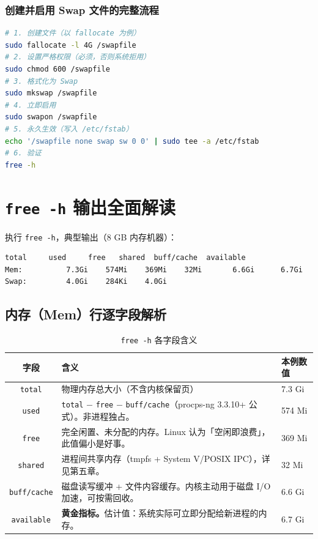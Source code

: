 \subsection*{创建并启用 Swap 文件的完整流程}

\begin{lstlisting}[language=bash]
# 1. 创建文件（以 fallocate 为例）
sudo fallocate -l 4G /swapfile
# 2. 设置严格权限（必须，否则系统拒用）
sudo chmod 600 /swapfile
# 3. 格式化为 Swap
sudo mkswap /swapfile
# 4. 立即启用
sudo swapon /swapfile
# 5. 永久生效（写入 /etc/fstab）
echo '/swapfile none swap sw 0 0' | sudo tee -a /etc/fstab
# 6. 验证
free -h
\end{lstlisting}


\chapter{\texttt{free -h} 输出全面解读}

执行 \texttt{free -h}，典型输出（8 GB 内存机器）：

\begin{lstlisting}[language=bash]
              total     used     free   shared  buff/cache  available
Mem:          7.3Gi    574Mi    369Mi    32Mi       6.6Gi      6.7Gi
Swap:         4.0Gi    284Ki    4.0Gi
\end{lstlisting}

\section{内存（Mem）行逐字段解析}

\begin{table}[htbp]
\centering
\caption{\texttt{free -h} 各字段含义}
\begin{tabular}{@{}c p{6.5cm} p{5cm}@{}}
\toprule
\textbf{字段} & \textbf{含义} & \textbf{本例数值} \\
\midrule
\texttt{total}   & 物理内存总大小（不含内核保留页） & 7.3 Gi \\
\addlinespace
\texttt{used}    & \texttt{total} $-$ \texttt{free} $-$ \texttt{buff/cache}（procps-ng 3.3.10+ 公式）。非进程独占。 & 574 Mi \\
\addlinespace
\texttt{free}    & 完全闲置、未分配的内存。Linux 认为「空闲即浪费」，此值偏小是好事。 & 369 Mi \\
\addlinespace
\texttt{shared}  & 进程间共享内存（tmpfs + System V/POSIX IPC），详见第五章。 & 32 Mi \\
\addlinespace
\texttt{buff/cache} & 磁盘读写缓冲 + 文件内容缓存。内核主动用于磁盘 I/O 加速，可按需回收。 & 6.6 Gi \\
\addlinespace
\texttt{available} & \textbf{黄金指标。}估计值：系统实际可立即分配给新进程的内存。 & 6.7 Gi \\
\bottomrule
\end{tabular}
\end{table}

